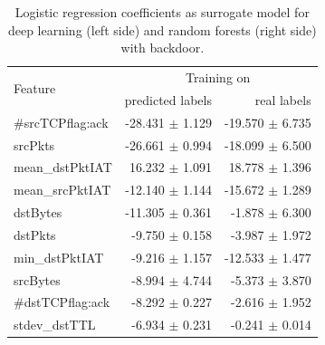 \documentclass[sigconf,nonacm]{acmart}
\begin{document}
 \begin{table}
 \caption{Logistic regression coefficients as surrogate model for deep learning (left side) and random forests (right side) with backdoor.} \label{tab:logreg_coeff_bd}
\begin{tabular}{l r r} \toprule 
\multirow{2}{*}{Feature} & \multicolumn{2}{c}{Training on} \\
  & predicted labels & real labels \\ \midrule
    \#srcTCPflag:ack &  -28.431 $\pm$ 1.129 &  -19.570 $\pm$ 6.735 \\
             srcPkts &  -26.661 $\pm$ 0.994 &  -18.099 $\pm$ 6.500 \\
     mean\_dstPktIAT &   16.232 $\pm$ 1.091 &   18.778 $\pm$ 1.396 \\
     mean\_srcPktIAT &  -12.140 $\pm$ 1.144 &  -15.672 $\pm$ 1.289 \\
            dstBytes &  -11.305 $\pm$ 0.361 &   -1.878 $\pm$ 6.300 \\
             dstPkts &   -9.750 $\pm$ 0.158 &   -3.987 $\pm$ 1.972 \\
      min\_dstPktIAT &   -9.216 $\pm$ 1.157 &  -12.533 $\pm$ 1.477 \\
            srcBytes &   -8.994 $\pm$ 4.744 &   -5.373 $\pm$ 3.870 \\
    \#dstTCPflag:ack &   -8.292 $\pm$ 0.227 &   -2.616 $\pm$ 1.952 \\
       stdev\_dstTTL &   -6.934 $\pm$ 0.231 &   -0.241 $\pm$ 0.014 \\

\end{tabular}
\end{table}
\end{document}
